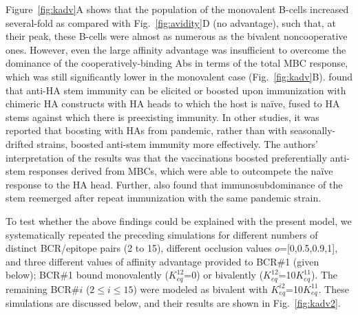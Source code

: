 \documentclass[utf8]{frontiersHLTH}%
\newcommand{\fig}[1]{Fig.~\ref{fig:#1}}
\newcommand{\Fig}[1]{Figure~\ref{fig:#1}}
\newcommand{\occl}{o}
\begin{document}
\Fig{kadv}A shows that the population of the monovalent B-cells increased
several-fold as compared with \fig{avidity}D (no advantage),
such that, at their peak, these B-cells were almost as numerous as the bivalent
noncooperative ones. However, even the large affinity
advantage was insufficient to overcome the dominance of the
cooperatively-binding Abs in terms of the
total MBC response, which was still significantly lower in the monovalent
case (\fig{kadv}B).
\citet{nachbagauer17a} found that anti-HA stem immunity can be elicited or boosted upon immunization with
chimeric HA constructs with HA heads to which the host is na\"ive, fused to
HA stems against which there is preexisting immunity.
In other
studies,\cite{krammer12,ellebedy14} it was reported that boosting with
HAs from pandemic, rather than with seasonally-drifted strains, boosted
anti-stem immunity more effectively. The authors' interpretation of the results
was that the vaccinations boosted preferentially anti-stem responses derived from MBCs, which were
able to outcompete the na\"ive response to the HA head.
Further, \citet{ellebedy14} also found that immunosubdominance of the stem
reemerged after repeat immunization with the same pandemic strain.

To test whether the above findings could be explained with the present
model, we systematically repeated the preceding simulations for different
numbers of distinct BCR/epitope pairs (2 to 15), different occlusion
values $\occl$=[0,0.5,0.9,1], and three different values of affinity advantage provided to BCR\#1 (given below);
BCR\#1 bound monovalently ($K^{12}_{eq}$=0) or bivalently ($K^{12}_{eq}$=10$K^{11}_{eq}$).
The remaining BCR\#$i$ ($2\le i\le15$) were modeled as
bivalent with $K^{i2}_{eq}$=10$K^{11}_{eq}$. These simulations are discussed below, and their results are shown in \fig{kadv2}.
\end{document}

